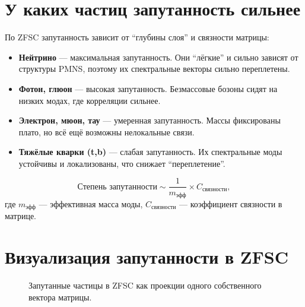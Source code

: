\documentclass[12pt,a4paper]{article}
\begin{document}
\section{У каких частиц запутанность сильнее}
По ZFSC запутанность зависит от ``глубины слоя'' и связности матрицы:
\begin{itemize}
  \item \textbf{Нейтрино} --- максимальная запутанность. Они ``лёгкие'' и сильно зависят от структуры PMNS, поэтому их спектральные векторы сильно переплетены.
  \item \textbf{Фотон, глюон} --- высокая запутанность. Безмассовые бозоны сидят на низких модах, где корреляции сильнее.
  \item \textbf{Электрон, мюон, тау} --- умеренная запутанность. Массы фиксированы плато, но всё ещё возможны нелокальные связи.
  \item \textbf{Тяжёлые кварки (t,b)} --- слабая запутанность. Их спектральные моды устойчивы и локализованы, что снижает ``переплетение''.
\end{itemize}

\[
\text{Степень запутанности} \sim \frac{1}{m_{\text{эфф}}} \times C_{\text{связности}},
\]
где $m_{\text{эфф}}$ --- эффективная масса моды, $C_{\text{связности}}$ --- коэффициент связности в матрице.


\section{Визуализация запутанности в ZFSC}

\begin{figure}[h!]
\centering
{}
\caption{Запутанные частицы в ZFSC как проекции одного собственного вектора матрицы.}
\end{figure}
\end{document}
